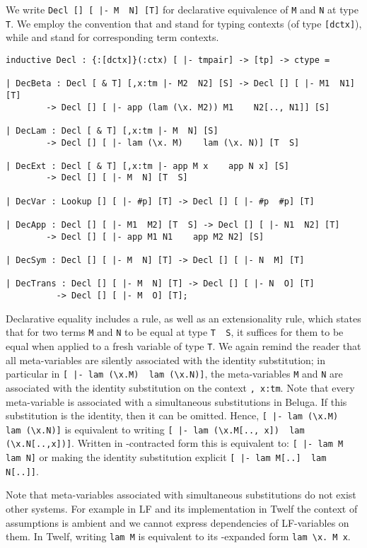 \documentclass[copyright,creativecommons]{eptcs}
\begin{document}
We write 
\lstinline{Decl [] [ |- M  N] [T]}
for declarative equivalence of \lstinline{M} and \lstinline{N} at type
\lstinline{T}. We employ
the convention that  and  stand
for typing contexts (of type \lstinline{[dctx]}), while  and  stand for
corresponding term contexts.

\begin{lstlisting}
inductive Decl : {:[dctx]}(:ctx) [ |- tmpair] -> [tp] -> ctype =

| DecBeta : Decl [ & T] [,x:tm |- M2  N2] [S] -> Decl [] [ |- M1  N1] [T]
        -> Decl [] [ |- app (lam (\x. M2)) M1    N2[.., N1]] [S]

| DecLam : Decl [ & T] [,x:tm |- M  N] [S]
        -> Decl [] [ |- lam (\x. M)    lam (\x. N)] [T  S]

| DecExt : Decl [ & T] [,x:tm |- app M x    app N x] [S]
        -> Decl [] [ |- M  N] [T  S]

| DecVar : Lookup [] [ |- #p] [T] -> Decl [] [ |- #p  #p] [T]

| DecApp : Decl [] [ |- M1  M2] [T  S] -> Decl [] [ |- N1  N2] [T]
        -> Decl [] [ |- app M1 N1    app M2 N2] [S]

| DecSym : Decl [] [ |- M  N] [T] -> Decl [] [ |- N  M] [T]

| DecTrans : Decl [] [ |- M  N] [T] -> Decl [] [ |- N  O] [T]
          -> Decl [] [ |- M  O] [T];
\end{lstlisting}

Declarative equality includes a  rule, as well as an extensionality rule, which states that for two terms
\lstinline{M} and \lstinline{N} to be equal at type \lstinline{T  S}, it suffices
for them to be equal when applied to a fresh variable of type
\lstinline{T}. We again remind the reader that all meta-variables are
silently associated with the identity substitution; in particular in
\lstinline![ |- lam (\x.M)  lam (\x.N)]!, the
meta-variables \lstinline!M! and \lstinline!N! are associated with the
identity substitution on the context \lstinline!, x:tm!. Note
that every meta-variable is associated with a simultaneous
substitutions in Beluga. If this substitution is the identity, then it can be omitted. Hence, 
\lstinline![ |- lam (\x.M)  lam (\x.N)]! is
equivalent to writing 
\lstinline![ |- lam (\x.M[.., x])  lam (\x.N[..,x])]!. Written
in -contracted form this is equivalent to:
\lstinline![ |- lam M  lam N]! or making the identity
substitution explicit \lstinline![ |- lam M[..]  lam N[..]]!.

Note that meta-variables associated with simultaneous substitutions do
not exist other systems. For example in LF and its implementation
in Twelf \cite{Pfenning99cade} the context of assumptions is ambient
and we cannot express dependencies of LF-variables on them. In Twelf,
writing \lstinline!lam M! is equivalent to its -expanded form
\lstinline!lam \x. M x!.
\end{document}
